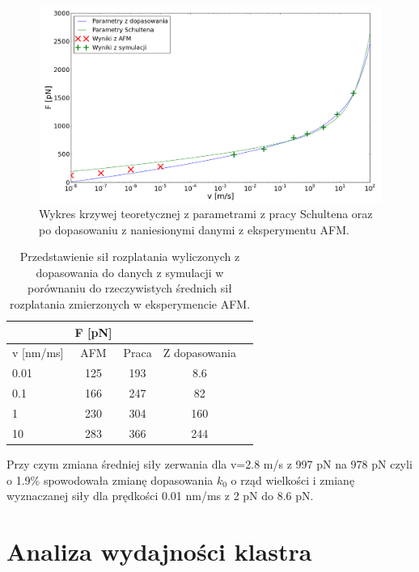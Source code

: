 \begin{figure}[H]
\begin{centering}
\includegraphics[width=150mm]{./rys/dop_schul.png}
\caption{Wykres krzywej teoretycznej z parametrami z pracy Schultena oraz po dopasowaniu z naniesionymi danymi z eksperymentu AFM.}
\end{centering}
\end{figure}

\begin{table}[H]
\centering
  \begin{tabular}{ l c c c c}
  & F [pN]\\
  \hline
 v [nm/ms]& AFM  & Praca\cite{szul} & Z dopasowania\\
  \hline
0.01 & 125 &  193 & 8.6 \\
0.1 & 166 &  247 & 82 \\
1 & 230 &  304 & 160\\
10 & 283 &  366 & 244\\

\hline
 \hline
  \end{tabular}
  \label{tab1}
  \caption{Przedstawienie sił rozplatania wyliczonych z dopasowania do danych z symulacji w porównaniu do rzeczywistych średnich sił rozplatania zmierzonych w eksperymencie AFM.}
\end{table}

Przy czym zmiana średniej siły zerwania dla v=2.8 m/s z 997 pN na 978 pN czyli o 1.9\% spowodowała zmianę dopasowania $k_0$ o rząd wielkości i zmianę wyznaczanej siły dla prędkości 0.01 nm/ms z 2 pN do 8.6 pN.

\section{Analiza wydajności klastra}

